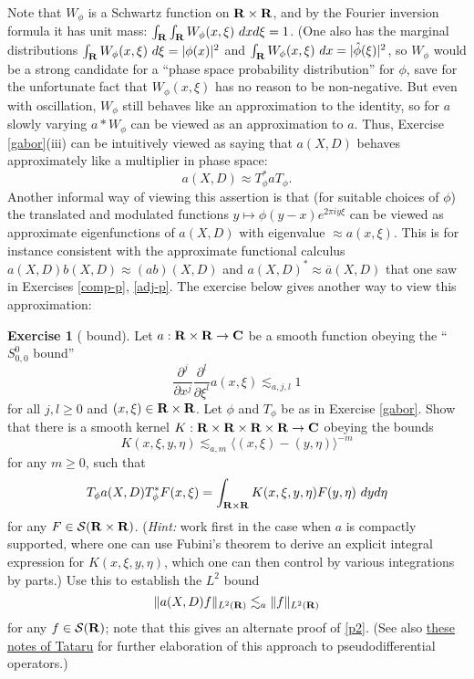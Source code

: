 \documentclass[11pt]{article}
\theoremstyle{definition}
\newtheorem{exercise}[theorem]{Exercise}
\begin{document}
Note that \({W_\phi}\) is a Schwartz function on \({{\bf R} \times {\bf R}}\), and by the Fourier inversion formula it has unit mass: \({\int_{\bf R} \int_{\bf R} W_\phi(x,\xi)\ dx d\xi = 1}\). (One also has the marginal distributions \({\int_{\bf R} W_\phi(x,\xi)\ d\xi = |\phi(x)|^2}\) and \({\int_{\bf R} W_\phi(x,\xi)\ dx = |\hat \phi(\xi)|^2}\), so \({W_\phi}\) would be a strong candidate for a “phase space probability distribution” for \({\phi}\), save for the unfortunate fact that \({W_\phi(x,\xi)}\) has no reason to be non-negative. But even with oscillation, \({W_\phi}\) still behaves like an approximation to the identity, so for \({a}\) slowly varying \({a*W_\phi}\) can be viewed as an approximation to \({a}\). Thus, Exercise \ref{gabor}(iii) can be intuitively viewed as saying that \({a(X,D)}\) behaves approximately like a multiplier in phase space: 
\[\displaystyle  a(X,D) \approx T_\phi^* a T_\phi.\]
 Another informal way of viewing this assertion is that (for suitable choices of \({\phi}\)) the translated and modulated functions \({y \mapsto \phi(y-x) e^{2\pi i y \xi}}\) can be viewed as approximate eigenfunctions of \({a(X,D)}\) with eigenvalue \({\approx a(x,\xi)}\). This is for instance consistent with the approximate functional calculus \({a(X,D) b(X,D) \approx (ab)(X,D)}\) and \({a(X,D)^* \approx \overline{a}(X,D)}\) that one saw in Exercises \ref{comp-p}, \ref{adj-p}. The exercise below gives another way to view this approximation:
\begin{exercise}[  bound]
  Let \({a: {\bf R} \times {\bf R} \rightarrow {\bf C}}\) be a smooth function obeying the “\({S^0_{0,0}}\) bound” 
\[\displaystyle \frac{\partial^j}{\partial x^j} \frac{\partial^l}{\partial \xi^l} a(x,\xi) \lesssim_{a,j,l} 1\]
 for all \({j,l \geq 0}\) and \({(x,\xi) \in {\bf R} \times {\bf R}}\). Let \({\phi}\) and \({T_\phi}\) be as in Exercise \ref{gabor}. Show that there is a smooth kernel \({K: {\bf R} \times {\bf R} \times {\bf R} \times {\bf R} \rightarrow {\bf C}}\) obeying the bounds 
\[\displaystyle  K( x,\xi, y,\eta ) \lesssim_{a,m} \langle (x,\xi) - (y,\eta) \rangle^{-m}\]
 for any \({m \geq 0}\), such that 
\[\displaystyle  T_\phi a(X,D) T_\phi^* F(x,\xi) = \int_{{\bf R} \times {\bf R}} K(x,\xi,y,\eta) F(y,\eta)\ dy d\eta\]
 for any \({F \in {\mathcal S}({\bf R} \times {\bf R})}\). (\emph{Hint:} work first in the case when \({a}\) is compactly supported, where one can use Fubini’s theorem to derive an explicit integral expression for \({K(x,\xi,y,\eta)}\), which one can then control by various integrations by parts.) Use this to establish the \({L^2}\) bound 
\[\displaystyle  \|a(X,D) f \|_{L^2({\bf R})} \lesssim_a \|f\|_{L^2({\bf R})}\]
 for any \({f \in {\mathcal S}({\bf R})}\); note that this gives an alternate proof of \eqref{p2}. (See also \href{https://math.berkeley.edu/~tataru/papers/phasespace.pdf}{these notes of Tataru} for further elaboration of this approach to pseudodifferential operators.) 
\end{exercise}
\end{document}
